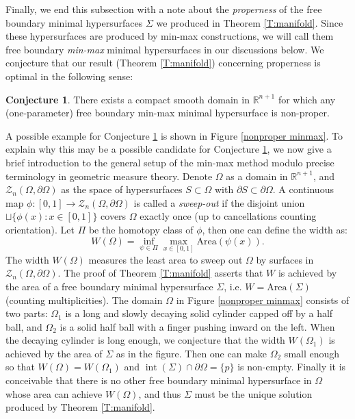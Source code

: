 \documentclass[10pt]{amsart}
\theoremstyle{definition}
\newtheorem{conjecture}[theorem]{Conjecture}
\theoremstyle{remark}
\numberwithin{equation}{section}
\newcommand{\R}{\mathbb{R}}
\newcommand{\Si}{\Sigma}
\newcommand{\Om}{\Omega}
\newcommand{\Area}{\textrm{Area}}
\newcommand{\interior}{\operatorname{int}}
\begin{document}

Finally, we end this subsection with a note about the \emph{properness} of the free boundary minimal hypersurfaces $\Sigma$ we produced in Theorem \ref{T:manifold}. Since these hypersurfaces are produced by min-max constructions, we will call them free boundary \emph{min-max} minimal hypersurfaces in our discussions below. We conjecture that our result (Theorem \ref{T:manifold}) concerning properness is optimal in the following sense:
\begin{conjecture}
\label{Con: properness1}
There exists a compact smooth domain in $\mathbb{R}^{n+1}$ for which any (one-parameter) free boundary min-max minimal hypersurface is non-proper.
\end{conjecture}

A possible example for Conjecture \ref{Con: properness1} is shown in Figure \ref{nonproper minmax}. To explain why this may be a possible candidate for Conjecture \ref{Con: properness1}, we now give a brief introduction to the general setup of the min-max method modulo precise terminology in geometric measure theory.  Denote $\Om$ as a domain in $\R^{n+1}$, and $\mathcal{Z}_n(\Om, \partial \Om)$ as the space of hypersurfaces $S\subset \Om$ with $\partial S\subset\partial \Om$. A continuous map $\phi: [0, 1]\rightarrow \mathcal{Z}_n(\Om, \partial \Om)$ is called a {\em sweep-out} if the disjoint union $\sqcup\{\phi(x): x\in[0, 1]\}$ covers $\Om$ exactly once (up to cancellations counting orientation). Let $\Pi$ be the homotopy class of $\phi$, then one can define the width as: 
$$W(\Om)=\inf_{\psi\in\Pi}\max_{x\in[0, 1]} \Area(\psi(x)).$$
The width $W(\Om)$ measures the least area to sweep out $\Om$ by surfaces in $\mathcal{Z}_n(\Om, \partial \Om)$. The proof of Theorem \ref{T:manifold} asserts that $W$ is achieved by the area of a free boundary minimal hypersurface $\Si$, i.e. $W=\Area(\Si)$ (counting multiplicities). The domain $\Omega$ in Figure \ref{nonproper minmax} consists of two parts: $\Om_1$ is a long and slowly decaying solid cylinder capped off by a half ball, and $\Om_2$ is a solid half ball with a finger pushing inward on the left. When the decaying cylinder is long enough, we conjecture that the width $W(\Om_1)$ is achieved by the area of $\Si$ as in the figure. Then one can make $\Om_2$ small enough so that $W(\Om)=W(\Om_1)$ and $\interior (\Si)\cap\partial\Om=\{p\}$ is non-empty.  Finally it is conceivable that there is no other free boundary minimal hypersurface in $\Om$ whose area can achieve $W(\Om)$, and thus $\Si$ must be the unique solution produced by Theorem \ref{T:manifold}.
\end{document}
